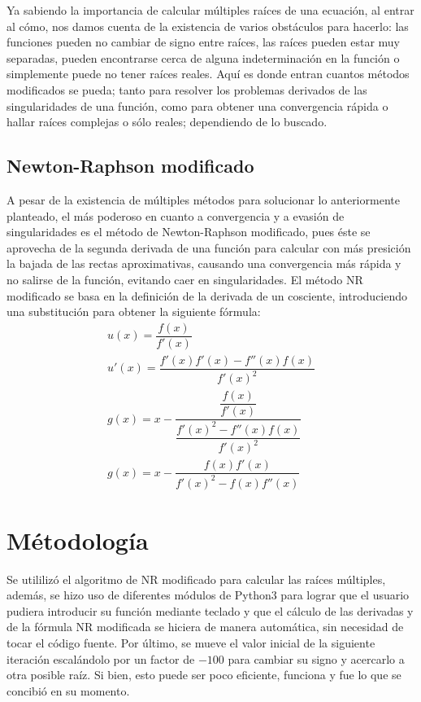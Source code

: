 \documentclass[12pt,oneside,FLEQN]{report}
\begin{document}
{Ya sabiendo la importancia de calcular múltiples raíces de una ecuación, al entrar al cómo, nos damos cuenta de la existencia de varios obstáculos para hacerlo: las funciones pueden no cambiar de signo entre raíces, las raíces pueden estar muy separadas, pueden encontrarse cerca de alguna indeterminación en la función o simplemente puede no tener raíces reales. Aquí es donde entran cuantos métodos modificados se pueda; tanto para resolver los problemas derivados de las singularidades de una función, como para obtener una convergencia rápida o hallar raíces complejas o sólo reales; dependiendo de lo buscado. \\

\section{Newton-Raphson modificado}
A pesar de la existencia de múltiples métodos para solucionar lo anteriormente planteado, el más poderoso en cuanto a convergencia y a evasión de singularidades es el método de Newton-Raphson modificado, pues éste se aprovecha de la segunda derivada de una función para calcular con más presición la bajada de las rectas aproximativas, causando una convergencia más rápida y no salirse de la función, evitando caer en singularidades. El método NR modificado se basa en la definición de la derivada de un cosciente, introduciendo una substitución para obtener la siguiente fórmula:
	\begin{gather}
		u(x)=\dfrac{f(x)}{f'(x)}\\
		u'(x)=\dfrac{f'(x)f'(x)-f''(x)f(x)}{{f'(x)}^2}\\
		g(x)=x-\dfrac{\dfrac{f(x)}{f'(x)}}{\dfrac{{f'(x)}^2-f''(x)f(x)}{{f'(x)}^2}}\\
		g(x)=x-\dfrac{f(x)f'(x)}{{f'(x)}^2-f(x)f''(x)}
	\end{gather}


\chapter{Métodología}
Se utililizó el algoritmo de NR modificado para calcular las raíces múltiples, además, se hizo uso de diferentes módulos de Python3 para lograr que el usuario pudiera introducir su función mediante teclado y que el cálculo de las derivadas y de la fórmula NR modificada se hiciera de manera automática, sin necesidad de tocar el código fuente. Por último, se mueve el valor inicial de la siguiente iteración escalándolo por un factor de $-100$ para cambiar su signo y acercarlo a otra posible raíz. Si bien, esto puede ser poco eficiente, funciona y fue lo que se concibió en su momento.
}
\end{document}

